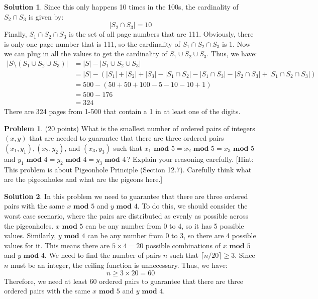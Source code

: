 \documentclass{article}
\theoremstyle{definition}
\newtheorem{problem}{Problem}
\newtheorem*{solution}{Solution}
\begin{document}
\begin{solution}
Since this only happens 10 times in the 100s, the cardinality of $S_2 \cap S_3$ is given by:
$$ |S_2 \cap S_3| = 10 $$
Finally, $S_1 \cap S_2 \cap S_3$ is the set of all page numbers that are 111.
Obviously, there is only one page number that is 111, so the cardinality of $S_1 \cap S_2 \cap S_3$ is 1.
Now we can plug in all the values to get the cardinality of $S_1 \cup S_2 \cup S_3$.
Thus, we have:
\begin{align*}
  |S \setminus (S_1 \cup S_2 \cup S_3)| &= |S| - |S_1 \cup S_2 \cup S_3| \\
  &= |S| - (|S_1| + |S_2| + |S_3| - |S_1 \cap S_2| - |S_1 \cap S_3| - |S_2 \cap S_3| + |S_1 \cap S_2 \cap S_3|) \\
  &= 500 - (50 + 50 + 100 - 5 - 10 - 10 + 1) \\
  &= 500 - 176 \\
  &= 324
\end{align*}
There are 324 pages from 1-500 that contain a 1 in at least one of the digits.
\end{solution}

\newpage
\begin{problem} (20 points) What is the smallest number of ordered pairs of integers 
$(x, y)$ that are needed to guarantee that there are three ordered pairs 
$(x_1, y_1), (x_2, y_2)$, and $(x_3, y_3)$ such that
$x_1\textbf{ mod } 5 = x_2 \textbf{ mod } 5 = x_3 \textbf{ mod } 5$ and 
$y_1 \textbf{ mod } 4 = y_2 \textbf{ mod } 4 = y_3 \textbf{ mod } 4$\,?
Explain your reasoning carefully.
[Hint: This problem is about Pigeonhole Principle (Section 12.7). 
Carefully think what are the pigeonholes and what are the pigeons here.]
\end{problem}
\begin{solution}
In this problem we need to guarantee that there are three ordered pairs
with the same $x \textbf{ mod } 5$ and $y \textbf{ mod } 4$.
To do this, we should consider the worst case scenario, where the pairs are distributed as evenly as possible across the pigeonholes.
$x \textbf{ mod } 5$ can be any number from 0 to 4, so it has 5 possible values.
Similarly, $y \textbf{ mod } 4$ can be any number from 0 to 3, so there are 4 possible values for it.
This means there are $5 \times 4 = 20$ possible combinations of $x \textbf{ mod } 5$ and $y \textbf{ mod } 4$.
We need to find the number of pairs $n$ such that $ \lceil n/20 \rceil \geq 3 $.
Since $n$ must be an integer, the ceiling function is unnecessary.
Thus, we have:
$$ n \geq 3 \times 20 = 60 $$
Therefore, we need at least 60 ordered pairs to guarantee that there are three ordered pairs with the same $x \textbf{ mod } 5$ and $y \textbf{ mod } 4$.
\end{solution}
\end{document}
